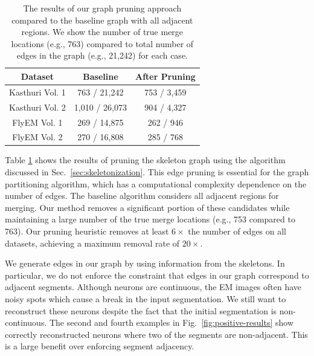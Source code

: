 \begin{table}
	\centering
	\small
	\begin{tabular}{c c c} \hline
		\textbf{Dataset} & \textbf{Baseline} & \textbf{After Pruning} \\ \hline
		Kasthuri Vol. 1 & 763 / 21,242 & 753 / 3,459 \\
		Kasthuri Vol. 2 & 1,010 / 26,073 & 904 / 4,327 \\
		FlyEM Vol. 1 & 269 / 14,875 & 262 / 946 \\
		FlyEM Vol. 2 & 270 / 16,808 & 285 / 768 \\ \hline
	\end{tabular}
	\caption{The results of our graph pruning approach compared to the baseline graph with all adjacent regions. We show the number of true merge locations (e.g., 763) compared to total number of edges in the graph (e.g., 21,242) for each case.}
	\label{table:skeletonization}
\end{table}

Table \ref{table:skeletonization} shows the results of pruning the skeleton graph using the algorithm discussed in Sec.~\ref{sec:skeletonization}. This edge pruning is essential for the graph partitioning algorithm, which has a computational complexity dependence on the number of edges. The baseline algorithm considers all adjacent regions for merging. Our method removes a significant portion of these candidates while maintaining a large number of the true merge locations (e.g., 753 compared to 763). Our pruning heuristic removes at least $6\times$ the number of edges on all datasets, achieving a maximum removal rate of $20\times$.

We generate edges in our graph by using information from the skeletons. 
In particular, we do not enforce the constraint that edges in our graph correspond to adjacent segments.
Although neurons are continuous, the EM images often have noisy spots which cause a break in the input segmentation.
We still want to reconstruct these neurons despite the fact that the initial segmentation is non-continuous. 
The second and fourth examples in Fig.~\ref{fig:positive-results} show correctly reconstructed neurons where two of the segments are non-adjacent. 
This is a large benefit over enforcing segment adjacency. 

